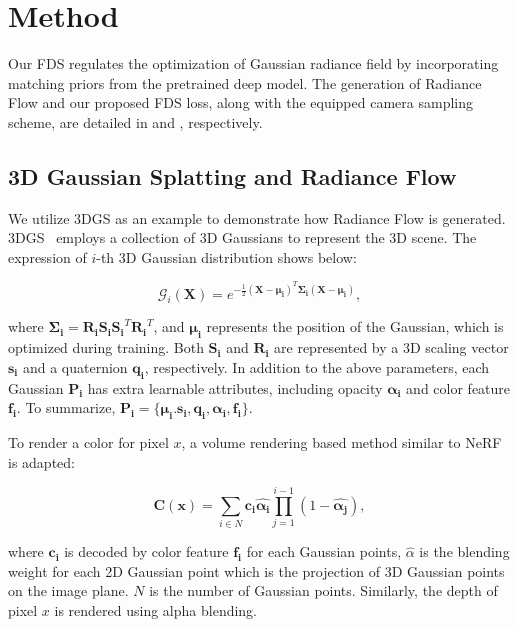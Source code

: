 \section{Method}
\label{sec:method}

Our FDS regulates the optimization 
of Gaussian radiance field by incorporating 
matching priors from the pretrained deep model.
%
The generation of Radiance Flow and
our proposed FDS loss, along with the equipped camera sampling scheme,  
are detailed in 
 and , 
respectively.
%

\subsection{3D Gaussian Splatting and Radiance Flow}
\label{sec:method:subsec:gs}

We utilize 3DGS as an example to demonstrate
how Radiance Flow is generated.
%
3DGS~\citep{kerbl20233d} employs a 
collection of 3D Gaussians to represent 
the 3D scene. 
%
The expression of $i$-th 3D Gaussian distribution shows below:

\begin{equation}
    \mathcal{G}_i(\bm{X}) 
    = e^{-\frac{1}{2} (\bm{X} - \bm{\mu_i})^T \bm{\Sigma_i} (\bm{X} - \bm{\mu_i})},
\end{equation}

where $\bm{\Sigma_i} = \bm{R_iS_i}\bm{S_i}^T\bm{R_i}^T$, 
and $\bm{\mu_i}$ represents the position of the Gaussian, which is optimized during training.
Both $\bm{S_i}$ and $\bm{R_i}$ are represented by 
a 3D scaling vector $\bm{s_i}$ and a quaternion $\bm{q_i}$, respectively.
%
In addition to the above parameters, each Gaussian $\bm{P_i}$ has extra learnable attributes, 
including opacity $\bm{\alpha_i}$ and color
feature $\bm{f_i}$.
%
To summarize, $\bm{P_i} = \{\bm{\mu_i}. \bm{s_i}, \bm{q_i}, \bm{\alpha_i}, \bm{f_i}\}$.
%

To render a color for pixel $x$, 
a volume rendering based method similar to NeRF~\citep{mildenhall2021nerf}
is adapted:
%

\begin{equation}
    \bm{C}(\bm{x}) = \sum_{i \in N} \bm{c_i} \bm{\hat{\alpha_i}} \prod_{j=1}^{i-1} (1-\bm{\hat{\alpha_j}}),
\end{equation}

where $\bm{c_i}$ is decoded by color feature $\bm{f_i}$ for each Gaussian points, $\hat{\alpha}$ is the blending weight for each 2D Gaussian point which is the projection of 3D Gaussian points on the image plane.
$N$ is the number of Gaussian points.
%
Similarly, the depth of pixel $x$ is rendered using alpha blending.

